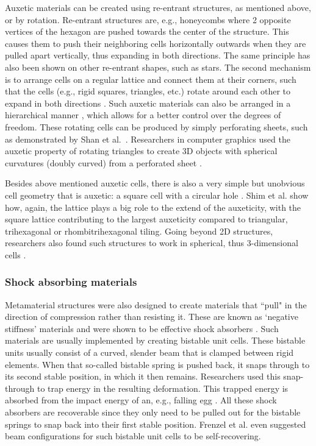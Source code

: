 {Auxetic materials can be created using re-entrant structures, as mentioned above, or by rotation. Re-entrant structures are, e.g., honeycombs where 2 opposite vertices of the hexagon are pushed towards the center of the structure. This causes them to push their neighboring cells horizontally outwards when they are pulled apart vertically, thus expanding in both directions. The same principle has also been shown on other re-entrant shapes, such as stars. The second mechanism is to arrange cells on a regular lattice and connect them at their corners, such that the cells (e.g., rigid squares, triangles, etc.) rotate around each other to expand in both directions \cite{Grima2000, Jiang2018}. Such auxetic materials can also be arranged in a hierarchical manner \cite{Seifi2017, Mousanezhad2015}, which allows for a better control over the degrees of freedom. These rotating cells can be produced by simply perforating sheets, such as demonstrated by Shan et al.~\cite{Shan2015a}. Researchers in computer graphics used the auxetic property of rotating triangles to create 3D objects with spherical curvatures (doubly curved) from a perforated sheet \cite{Konakovic2016}.

Besides above mentioned auxetic cells, there is also a very simple but unobvious cell geometry that is auxetic: a square cell with a circular hole \cite{Mullin2007, Bertoldi2010}. Shim et al. \cite{Shim2013a} show how, again, the lattice plays a big role to the extend of the auxeticity, with the square lattice contributing to the largest auxeticity compared to triangular, trihexagonal or rhombitrihexagonal tiling. Going beyond 2D structures, researchers also found such structures to work in spherical, thus 3-dimensional cells \cite{Shim2012, Babaee2013}. 




\subsubsection{Shock absorbing materials}

Metamaterial structures were also designed to create materials that ``pull" in the direction of compression rather than resisting it. These are known as `negative stiffness' materials and were shown to be effective shock absorbers \cite{Shan2015, Restrepo2015, Rafsanjani2015, Correa2015, Correa2015b, Harne2013}. Such materials are usually implemented by creating bistable unit cells. These bistable units usually consist of a curved, slender beam that is clamped between rigid elements. When that so-called bistable spring is pushed back, it snaps through to its second stable position, in which it then remains. Researchers used this snap-through to trap energy in the resulting deformation. This trapped energy is absorbed from the impact energy of an, e.g., falling egg \cite{Shan2015}. All these shock absorbers are recoverable since they only need to be pulled out for the bistable springs to snap back into their first stable position. Frenzel et al. \cite{Frenzel2016a} even suggested beam configurations for such bistable unit cells to be self-recovering.  

}
